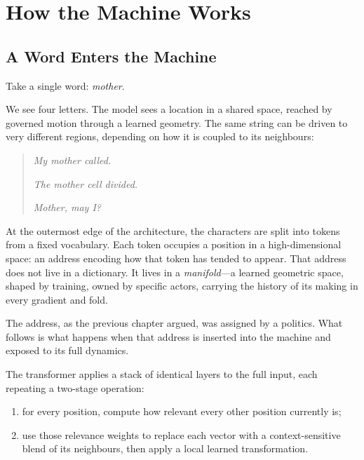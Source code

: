 
\chapter{How the Machine Works}
\thispagestyle{plain}

\bigskip

\section{A Word Enters the Machine}

Take a single word: \emph{mother}.

We see four letters. The model sees a location in a shared space, reached by governed motion through a learned geometry. The same string can be driven to very different regions, depending on how it is coupled to its neighbours:

\begin{quote}
\emph{My mother called.}

\emph{The mother cell divided.}

\emph{Mother, may I?}
\end{quote}

At the outermost edge of the architecture, the characters are split into tokens from a fixed vocabulary. Each token occupies a position in a high-dimensional space: an address encoding how that token has tended to appear. That address does not live in a dictionary. It lives in a \emph{manifold}---a learned geometric space, shaped by training, owned by specific actors, carrying the history of its making in every gradient and fold.

The address, as the previous chapter argued, was assigned by a politics. What follows is what happens when that address is inserted into the machine and exposed to its full dynamics.

The transformer applies a stack of identical layers to the full input, each repeating a two-stage operation:

\begin{enumerate}
  \item for every position, compute how relevant every other position currently is;
  \item use those relevance weights to replace each vector with a context-sensitive blend of its neighbours, then apply a local learned transformation.
\end{enumerate}

